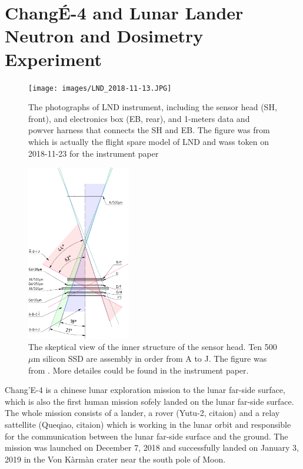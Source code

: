 \section{Chang\'E-4 and Lunar Lander Neutron and Dosimetry Experiment}
\label{sec:change_4_LND}

\begin{figure}
    \centering
    \texttt{[image: images/LND\_2018-11-13.JPG]}

    \caption{The photographs of LND instrument, including the sensor head (SH, front), and electronics box (EB, rear), and 1-meters data and powver harness that connects the SH and EB. The figure was from \cite{Wimmer-2020-LND} which is actually the flight spare model of LND and wass token on 2018-11-23 for the instrument paper}
    \label{Fig:LND_instrument}
\end{figure}

\begin{figure}
    \centering
    \includegraphics[width = 0.4\textwidth]{images/change4_lnd-c9_trigger-cones-colored.pdf}
    \caption{The skeptical view of the inner structure of the sensor head. Ten 500 $\mu$m silicon \acs{SSD} are assembly in order from A to J. The figure was from \cite{Wimmer-2020-LND}. More detailes could be found in the instrument paper.}
\end{figure}
Chang'E-4 is a chinese lunar exploration mission to the lunar far-side surface, which is also the first human mission sofely landed on the lunar far-side surface. The whole mission consists of a lander, a rover (Yutu-2, citaion) and a relay sattellite (Queqiao, citaion) which is working in the lunar orbit and responsible for the communication between the lunar far-side surface and the ground. The mission was launched on December 7, 2018 and successfully landed on January 3, 2019 in the Von K\`arm\`an crater near the south pole of Moon. 

